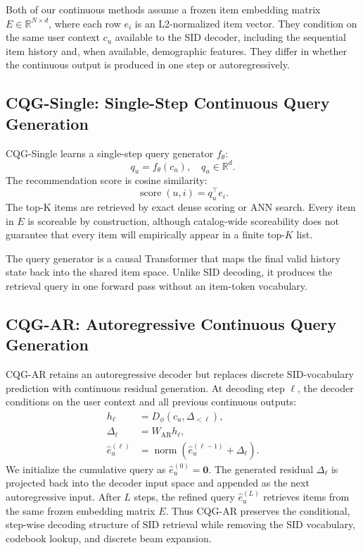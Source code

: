 \documentclass[preprint,12pt]{elsarticle}
\begin{document}
Both of our continuous methods assume a frozen item embedding matrix $E\in\mathbb{R}^{N\times d}$, where each row $e_i$ is an L2-normalized item vector. They condition on the same user context $c_u$ available to the SID decoder, including the sequential item history and, when available, demographic features. They differ in whether the continuous output is produced in one step or autoregressively.

\subsection{CQG-Single: Single-Step Continuous Query Generation}

CQG-Single learns a single-step query generator $f_\theta$:
\begin{equation}
q_u = f_\theta(c_u), \quad q_u\in\mathbb{R}^d .
\end{equation}
The recommendation score is cosine similarity:
\begin{equation}
\operatorname{score}(u,i)=q_u^\top e_i .
\end{equation}
The top-K items are retrieved by exact dense scoring or ANN search. Every item in $E$ is scoreable by construction, although catalog-wide scoreability does not guarantee that every item will empirically appear in a finite top-$K$ list.

The query generator is a causal Transformer that maps the final valid history
state back into the shared item space. Unlike SID decoding, it produces the
retrieval query in one forward pass without an item-token vocabulary.

\subsection{CQG-AR: Autoregressive Continuous Query Generation}

CQG-AR retains an autoregressive decoder but replaces discrete SID-vocabulary prediction with continuous residual generation. At decoding step $\ell$, the decoder conditions on the user context and all previous continuous outputs:
\begin{align}
h_\ell &= D_\phi(c_u,\Delta_{<\ell}),\\
\Delta_\ell &= W_{\mathrm{AR}}h_\ell,\\
\hat e_u^{(\ell)} &=
\operatorname{norm}\!\left(\hat e_u^{(\ell-1)}+\Delta_\ell\right).
\end{align}
We initialize the cumulative query as
\(\hat e_u^{(0)}=\mathbf{0}\).
The generated residual $\Delta_\ell$ is projected back into the decoder input space and appended as the next autoregressive input. After $L$ steps, the refined query $\hat e_u^{(L)}$ retrieves items from the same frozen embedding matrix $E$. Thus CQG-AR preserves the conditional, step-wise decoding structure of SID retrieval while removing the SID vocabulary, codebook lookup, and discrete beam expansion.
\end{document}
